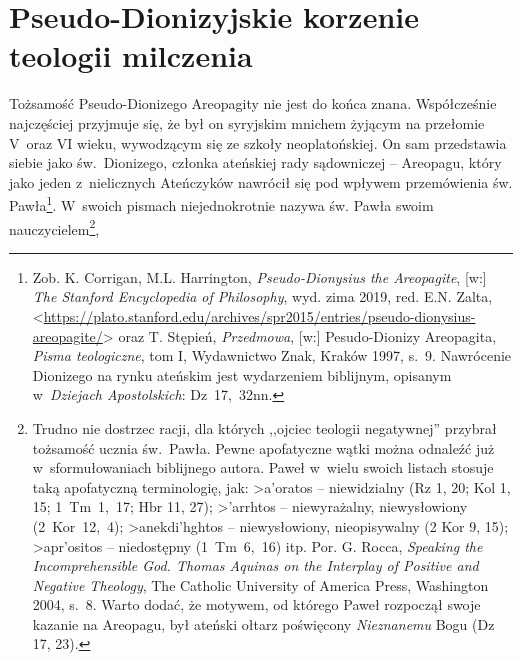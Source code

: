 \section{Pseudo-Dionizyjskie korzenie teologii milczenia}\label{sil-dionizy}

Tożsamość Pseudo-Dionizego Areopagity nie jest do końca znana. Współcześnie najczęściej przyjmuje się, że był on syryjskim mnichem żyjącym na przełomie V~oraz VI wieku, wywodzącym się ze szkoły neoplatońskiej. On sam przedstawia siebie jako św.~Dionizego, członka ateńskiej rady sądowniczej -- Areopagu, który jako jeden z~nielicznych Ateńczyków nawrócił się pod wpływem przemówienia św. Pawła\footnote{Zob. K. Corrigan, M.L. Harrington, \textit{Pseudo-Dionysius the Areopagite}, [w:] \textit{The Stanford Encyclopedia of Philosophy}, wyd. zima 2019, red. E.N. Zalta, {\textless}\url{https://plato.stanford.edu/archives/spr2015/entries/pseudo-dionysius-areopagite/}{\textgreater} oraz T. Stępień, \textit{Przedmowa}, [w:] Pesudo-Dionizy Areopagita, \textit{Pisma teologiczne}, tom I, Wydawnictwo Znak, Kraków 1997, s.~9. Nawrócenie Dionizego na rynku ateńskim jest wydarzeniem biblijnym, opisanym w~\textit{Dziejach Apostolskich}: Dz~17,~32nn.}. W~swoich pismach niejednokrotnie nazywa św. Pawła swoim nauczycielem\footnote{Trudno nie dostrzec racji, dla których ,,ojciec teologii negatywnej'' przybrał tożsamość ucznia św.~Pawła. Pewne apofatyczne wątki można odnaleźć już w~sformułowaniach biblijnego autora. Paweł w~wielu swoich listach stosuje taką apofatyczną terminologię, jak:
\textgreek{>a'oratos}
-- niewidzialny (Rz 1, 20; Kol 1, 15; 1~Tm~1,~17; Hbr 11, 27);
\textgreek{>'arrhtos}
-- niewyrażalny, niewysłowiony (2~Kor~12,~4);
\textgreek{>anekdi'hghtos}
-- niewysłowiony, nieopisywalny (2 Kor 9, 15);
\textgreek{>apr'ositos}
-- niedostępny (1~Tm~6,~16) itp. Por. G. Rocca, \textit{Speaking the Incomprehensible God. Thomas Aquinas on the Interplay of Positive and Negative Theology}, The Catholic University of America Press, Washington 2004, s.~8. Warto dodać, że motywem, od którego Paweł rozpoczął swoje kazanie na Areopagu, był ateński ołtarz poświęcony \textit{Nieznanemu} Bogu (Dz 17, 23).},
